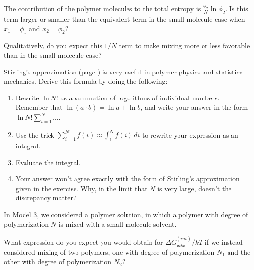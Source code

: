 \begin{activity}
\begin{ctqs}

		\question The contribution of the polymer molecules to the total entropy is $\frac{\phi_2}{N} \ln \phi_2$.  Is this term larger or smaller than the equivalent term in the small-molecule case when $x_1 = \phi_1$ and $x_2 = \phi_2$?
		
		\question Qualitatively, do you expect this $1/N$ term to make mixing more or less favorable than in the small-molecule case?
			
\end{ctqs}

\begin{exercises}

		\exercise Stirling's approximation (page \pageref{eqn:stirling}) is very useful in polymer physics and statistical mechanics.  Derive this formula by doing the following:
			\begin{enumerate}
				\item Rewrite $\ln N!$ as a summation of logarithms of individual numbers.  Remember that $\ln (a\cdot b) = \ln a + \ln b$, and write your answer in the form $\ln N!\sum_{i=1}^N \dots$.
				\item Use the trick $\sum_{i=1}^{N} f(i) \approx \int_1^N f(i)\,di$ to rewrite your expression as an integral.
				\item Evaluate the integral.
				\item Your answer won't agree exactly with the form of Stirling's approximation given in the exercise.  Why, in the limit that $N$ is very large, doesn't the discrepancy matter?
			\end{enumerate}
			
		\exercise In Model 3, we considered a polymer solution, in which a polymer with degree of polymerization $N$ is mixed with a small molecule solvent.
		
			What expression do you expect you would obtain for $\Delta G_{mix}^{(int)}/kT$ if we instead considered mixing of two polymers, one with degree of polymerization $N_1$ and the other with degree of polymerization $N_2$?
\end{exercises}
	
\end{activity}